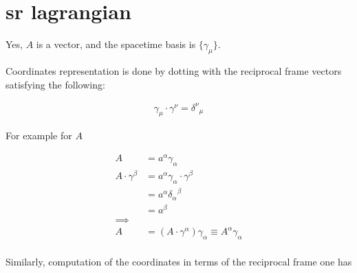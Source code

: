 
%

%
%


\chapter{sr lagrangian}





Yes, $A$ is a vector, and the spacetime basis is $\{\gamma_\mu\}$.

Coordinates representation is done by dotting with the reciprocal frame
vectors satisfying the following:

\begin{align*}
\gamma_\mu \cdot \gamma^\nu = {\delta^\nu}_\mu
\end{align*}

For example for $A$

\begin{align*}
A &= a^\alpha \gamma_\alpha \\
A \cdot \gamma^\beta
&= a^\alpha \gamma_\alpha \cdot \gamma^\beta \\
&= a^\alpha {\delta_\alpha}^\beta \\
&= a^\beta \\
\implies \\
A &= \left(A \cdot \gamma^\alpha\right) \gamma_\alpha \equiv A^\alpha \gamma_\alpha \\
\end{align*}

Similarly, computation of the coordinates in terms of the reciprocal frame
one has

